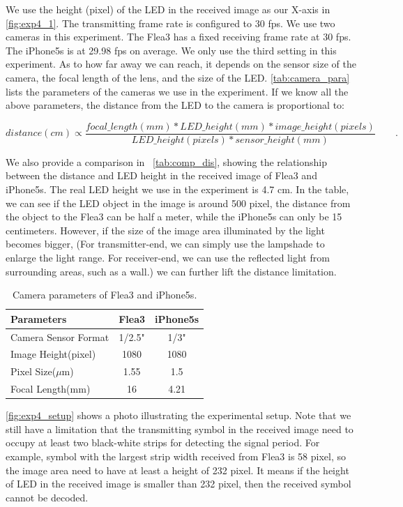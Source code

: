 We use the height (pixel) of the LED in the received image as our X-axis in \autoref{fig:exp4_1}. The transmitting frame rate is configured to 30 fps. We use two cameras in this experiment. The Flea3 has a fixed receiving frame rate at 30 fps. The iPhone5s is at 29.98 fps on average. We only use the third setting in this experiment. As to how far away we can reach, it depends on the sensor size of the camera, the focal length of the lens, and the size of the LED. \autoref{tab:camera_para} lists the parameters of the cameras we use in the experiment. If we know all the above parameters, the distance from the LED to the camera is proportional to:

\begin{equation}
	distance (cm) \propto \frac{focal\_length (mm) * LED\_height (mm) * image\_height (pixels)}{LED\_height (pixels) * sensor\_height (mm)} 
	\qquad \textrm{.}
\end{equation} 

We also provide a comparison in ~\autoref{tab:comp_dis}, showing the relationship between the distance and LED height in the received image of Flea3 and iPhone5s. The real LED height we use in the experiment is 4.7 cm. In the table, we can see if the LED object in the image is around 500 pixel, the distance from the object to the Flea3 can be half a meter, while the iPhone5s can only be 15 centimeters. However, if the size of the image area illuminated by the light becomes bigger, (For transmitter-end, we can simply use the lampshade to enlarge the light range. For receiver-end, we can use the reflected light from surrounding areas, such as a wall.) we can further lift the distance limitation. 

\begin{table}[!htb]
\centering
\caption{Camera parameters of Flea3 and iPhone5s.}
  \begin{tabular}{lcc}
  \hline Parameters & Flea3 & iPhone5s \\
  \hline 
  \hline Camera Sensor Format & 1/2.5" & 1/3" \\
  \hline Image Height(pixel) & 1080 & 1080\\
  \hline Pixel Size($\mu$m) & 1.55 & 1.5 \\
  \hline Focal Length(mm) & 16 & 4.21 \\
  \end{tabular}
  \label{tab:camera_para} 
\end{table}

\autoref{fig:exp4_setup} shows a photo illustrating the experimental setup. Note that we still have a limitation that the transmitting symbol in the received image need to occupy at least two black-white strips for detecting the signal period. For example, symbol with the largest strip width received from Flea3 is 58 pixel, so the image area need to have at least a height of 232 pixel. It means if the height of LED in the received image is smaller than 232 pixel, then the received symbol cannot be decoded.

